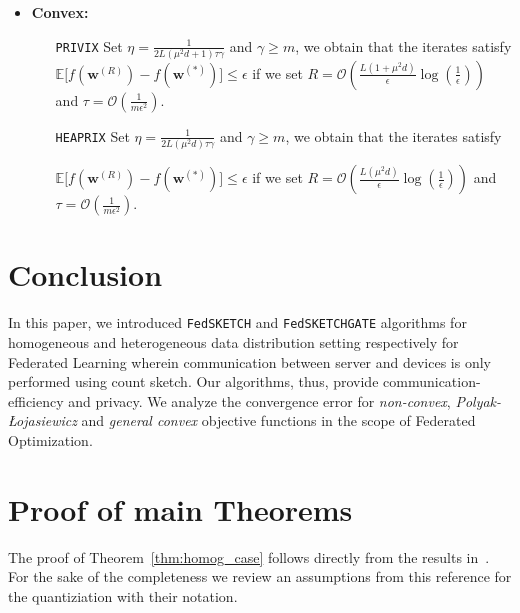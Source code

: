 \documentclass[review,onefignum,onetabnum]{siamart190516}
\newcommand{\pl}{Polyak-\L{}ojasiewicz}
\begin{document}
\begin{theorem}
\begin{itemize}
     \item \textbf{Convex:}
     \begin{itemize}
         \item [\texttt{PRIVIX}] Set $\eta=\frac{1}{2L\left(\mu^2d+1\right)\tau\gamma}$ and $\gamma\geq m$, we obtain that the iterates satisfy $ \mathbb{E}\Big[f({\boldsymbol{w}}^{(R)})-f({\boldsymbol{w}}^{(*)})\Big]\leq \epsilon$ if we set
     $R=\mathcal{O}\left(\frac{L\left(1+\mu^2d\right)}{\epsilon}\log\left(\frac{1}{\epsilon}\right)\right)$ and $ \tau=\mathcal{O}\left(\frac{1}{m\epsilon^2}\right).$
         \item [\texttt{HEAPRIX}] Set  $\eta=\frac{1}{2L\left(\mu^2d\right)\tau\gamma}$ and $\gamma\geq m$, we obtain that the iterates satisfy 
         
         $ \mathbb{E}\Big[f({\boldsymbol{w}}^{(R)})-f({\boldsymbol{w}}^{(*)})\Big]\leq \epsilon$ if we set
     $R=\mathcal{O}\left(\frac{L\left(\mu^2d\right)}{\epsilon}\log\left(\frac{1}{\epsilon}\right)\right)$ and $ \tau=\mathcal{O}\left(\frac{1}{m\epsilon^2}\right).$ 
     \end{itemize}
 \end{itemize}
\end{theorem}

\section{Conclusion}\label{sec:conclusion}
In this paper, we introduced \texttt{FedSKETCH} and \texttt{FedSKETCHGATE} algorithms for homogeneous and heterogeneous data distribution setting respectively for Federated Learning wherein communication between server and devices is only performed using count sketch. 
Our algorithms, thus, provide communication-efficiency and privacy. 
We analyze the convergence error for \emph{non-convex}, \emph{\pl} and \emph{general convex} objective functions in the scope of Federated Optimization.     



\newpage



\newpage

\appendix
\section{Proof of main Theorems}
The proof of Theorem~\ref{thm:homog_case} follows directly from the results in~\cite{haddadpour2020federated}. For the sake of the completeness we review an assumptions from this reference for the quantiziation with their notation.
\end{document}
